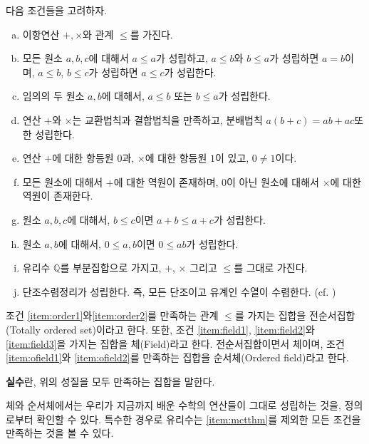 \begin{definition}
\label{def:reals}
    다음 조건들을 고려하자.
    \begin{enumerate}[(a)]
        \item 이항연산 $+, \times$와 관계 $\leq$를 가진다.
        \item \label{item:order1} 모든 원소 $a, b, c$에 대해서 $a \leq a$가 성립하고, $a \leq b$와 $b \leq a$가 성립하면 $a = b$이며, $a \leq b$, $b \leq c$가 성립하면 $a \leq c$가 성립한다.
        \item \label{item:order2} 임의의 두 원소 $a, b$에 대해서, $a \leq b$ 또는 $b \leq a$가 성립한다.
        \item \label{item:field1} 연산 $+$와 $\times$는 교환법칙과 결합법칙을 만족하고, 분배법칙 $a(b + c) = ab + ac$또한 성립한다.
        \item \label{item:field2} 연산 $+$에 대한 항등원 $0$과, $\times$에 대한 항등원 $1$이 있고, $0 \neq 1$이다.
        \item \label{item:field3} 모든 원소에 대해서 $+$에 대한 역원이 존재하며, $0$이 아닌 원소에 대해서 $\times$에 대한 역원이 존재한다.
        \item \label{item:ofield1} 원소 $a, b, c$에 대해서, $b \leq c$이면 $a+b \leq a+c$가 성립한다.
        \item \label{item:ofield2} 원소 $a, b$에 대해서, $0 \leq a, b$이면 $0 \leq ab$가 성립한다.
        \item \label{item:ratcontain} 유리수 $\mathbb{Q}$를 부분집합으로 가지고, $+$, $\times$ 그리고 $\leq$를 그대로 가진다.
        \item \label{item:mctthm} 단조수렴정리가 성립한다. 즉, 모든 단조이고 유계인 수열이 수렴한다. (cf. ) 
    \end{enumerate}
    조건 \ref{item:order1}와\ref{item:order2}를 만족하는 관계 $\leq$를 가지는 집합을 전순서집합(Totally ordered set)이라고 한다.
    또한, 조건 \ref{item:field1}, \ref{item:field2}와 \ref{item:field3}을 가지는 집합을 체(Field)라고 한다.
    전순서집합이면서 체이며, 조건 \ref{item:ofield1}와 \ref{item:ofield2}를 만족하는 집합을 순서체(Ordered field)라고 한다.
    
    \textbf{실수}란, 위의 성질을 모두 만족하는 집합을 말한다.
\end{definition}
체와 순서체에서는 우리가 지금까지 배운 수학의 연산들이 그대로 성립하는 것을, 정의로부터 확인할 수 있다.
특수한 경우로 유리수는 \ref{item:mctthm}를 제외한 모든 조건을 만족하는 것을 볼 수 있다.

